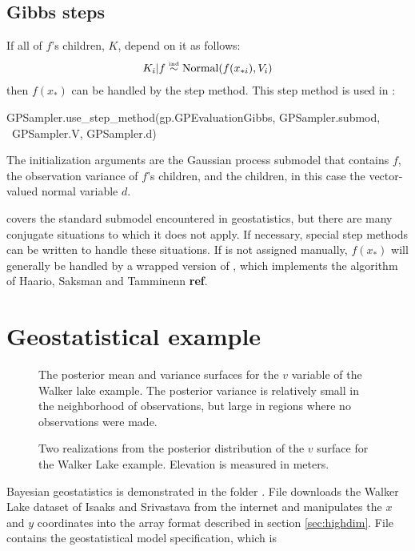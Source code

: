 \subsection{Gibbs steps}
If all of $f$'s children, $K$, depend on it as follows:
\begin{eqnarray*}
    K_i|f \stackrel{\textup{\tiny ind}}{\sim} \textup{Normal}(f(x_{*i}),V_i)
\end{eqnarray*}
then $f(x_*)$ can be handled by the  step method. This step method is used in :
\begin{CodeChunk}
\begin{CodeInput}
GPSampler.use_step_method(gp.GPEvaluationGibbs, GPSampler.submod, \
    GPSampler.V, GPSampler.d)
\end{CodeInput}
\end{CodeChunk}
The initialization arguments are the Gaussian process submodel that contains $f$, the observation variance of $f$'s children, and the children, in this case the vector-valued normal variable $d$.

 covers the standard submodel encountered in geostatistics, but there are many conjugate situations to which it does not apply. If necessary, special step methods can be written to handle these situations. If  is not assigned manually, $f(x_*)$ will generally be handled by a wrapped version of  \citep{pymc}, which implements the algorithm of Haario, Saksman and Tamminenn \textbf{ref}.





\section{Geostatistical example}\label{sub:geostat}
\begin{figure}
    \centering
    \caption{The posterior mean and variance surfaces for the $v$ variable of the Walker lake example. The posterior variance is relatively small in the neighborhood of observations, but large in regions where no observations were made.}
    \label{fig:walker}
\end{figure}
\begin{figure}
    \centering
    \caption{Two realizations from the posterior distribution of the $v$ surface for the Walker Lake example. Elevation is measured in meters.}
    \label{fig:walkerreal}
\end{figure}
Bayesian geostatistics is demonstrated in the folder . File  downloads the Walker Lake dataset of Isaaks and Srivastava \citep{isaaks} from the internet and manipulates the $x$ and $y$ coordinates into the array format described in section \ref{sec:highdim}. File  contains the geostatistical model specification, which is

